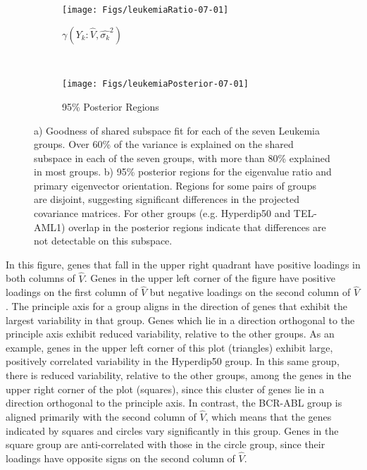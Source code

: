 \documentclass[12pt]{article}
\begin{document}
\begin{figure}[t]
    \centering
    \begin{subfigure}[b]{0.45\textwidth}
        \texttt{[image: Figs/leukemiaRatio-07-01]}
        \caption{$\gamma(Y_k: \hat{V}, \hat{\sigma_k}^2)$}
        \label{fig:leukemiaRatio}
    \end{subfigure}
    ~ %
    \begin{subfigure}[b]{0.45\textwidth}
        \texttt{[image: Figs/leukemiaPosterior-07-01]}
        \caption{95\% Posterior Regions }
        \label{fig:leukemiaPosterior}
      \end{subfigure}
      \caption{a) Goodness of shared subspace fit for each of the
        seven Leukemia groups.  Over 60\% of the variance is explained
        on the shared subspace in each of the seven groups, with
        more than 80\% explained in most groups.  b) 95\% posterior
        regions for the eigenvalue ratio and primary eigenvector
        orientation.  Regions for some pairs of groups are disjoint,
        suggesting significant differences in the projected covariance
        matrices.  For other groups (e.g. Hyperdip50 and TEL-AML1)
        overlap in the posterior regions indicate that differences are
        not detectable on this subspace. }
\label{fig:leukemia}
\end{figure}

In this figure, genes that fall in the upper right quadrant have
positive loadings in both columns of $\hat{V}$. Genes in the upper left
corner of the figure have positive loadings on the first column of $\hat{V}$
but negative loadings on the second column of $\hat{V}$.  The principle axis
for a group aligns in the direction of genes that exhibit the largest
variability in that group.  Genes which lie in a direction orthogonal
to the principle axis exhibit reduced variability, relative to the
other groups. As an example, genes in the upper left corner of this
plot (triangles) exhibit large, positively correlated variability in
the Hyperdip50 group.  In this same group, there is reduced
variability, relative to the other groups, among the genes in the
upper right corner of the plot (squares), since this cluster of genes lie in
a direction orthogonal to the principle axis.  In contrast, the
BCR-ABL group is aligned primarily with the second column of $\hat{V}$,
which means that the genes indicated by squares and circles vary
significantly in this group.  Genes in the square group are
anti-correlated with those in the circle group, since their
loadings have opposite signs on the second column of $\hat{V}$.
\end{document}
